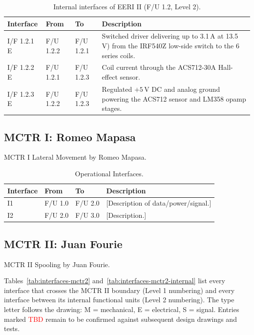 \begin{table}[H]
    \centering
    \caption{Internal interfaces of EERI II (F/U 1.2, Level 2).}
    \label{tab:interfaces-eeri2-internal}
    \begin{tabularx}{\textwidth}{@{} l l l X @{}}
        \toprule
        \textbf{Interface} & \textbf{From} & \textbf{To} & \textbf{Description} \\
        \midrule
        I/F 1.2.1 E & F/U 1.2.2 & F/U 1.2.1 & Switched driver delivering up to 3.1\,A at 13.5\,V) from the IRF540Z low-side switch to the 6 series coils. \\
        I/F 1.2.2 E & F/U 1.2.1 & F/U 1.2.3 & Coil current through the ACS712-30A Hall-effect sensor. \\
        I/F 1.2.3 E & F/U 1.2.2 & F/U 1.2.3 & Regulated $+5\,\text{V}$ DC and analog ground powering the ACS712 sensor and LM358 opamp stages. \\
        \bottomrule
    \end{tabularx}
\end{table}



\subsection{MCTR I: Romeo Mapasa }
\label{subsec:mctr1-interfaces}
MCTR I Lateral Movement by Romeo Mapasa.
\begin{table}[H]
    \centering
    \caption{Operational Interfaces.}
    \label{tab:interfaces-mctr1}
    \begin{tabular}{@{} l l l p{5cm} @{}}
        \toprule
        \textbf{Interface} & \textbf{From} & \textbf{To} & \textbf{Description} \\
        \midrule
        I1 & F/U 1.0 & F/U 2.0 & [Description of data/power/signal.] \\
        I2 & F/U 2.0 & F/U 3.0 & [Description.] \\
        \bottomrule
    \end{tabular}
\end{table}




\subsection{MCTR II: Juan Fourie}
\label{subsec:mctr2-interfaces}
MCTR II Spooling by Juan Fourie.



Tables~\ref{tab:interfaces-mctr2} and~\ref{tab:interfaces-mctr2-internal} list every interface that crosses the
MCTR II boundary (Level 1 numbering) and every interface between its internal
functional units (Level 2 numbering). The type letter follows the drawing:
M = mechanical, E = electrical, S = signal. Entries marked
\textcolor{red}{TBD} remain to be confirmed against subsequent design drawings and tests.
 
